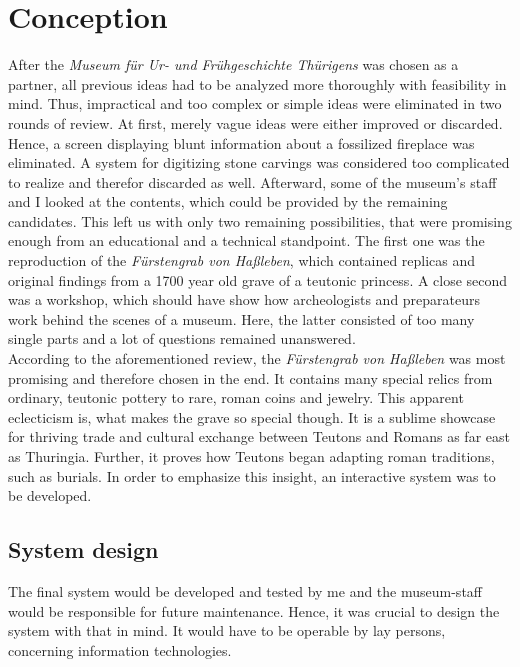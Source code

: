 \chapter{Conception}
\label{conception}

After the \textit{Museum für Ur- und Frühgeschichte Thürigens} was chosen as a partner, all previous ideas had to be analyzed more thoroughly with feasibility in mind. Thus, impractical and too complex or simple ideas were eliminated in two rounds of review. At first, merely vague ideas were either improved or discarded. Hence, a screen displaying blunt information about a fossilized fireplace was eliminated. A system for digitizing stone carvings was considered too complicated to realize and therefor discarded as well. Afterward, some of the museum's staff and I looked at the contents, which could be provided by the remaining candidates. This left us with only two remaining possibilities, that were promising enough from an educational and a technical standpoint. The first one was the reproduction of the \textit{Fürstengrab von Haßleben}, which contained replicas and original findings from a 1700 year old grave of a teutonic princess. A close second was a workshop, which should have show how archeologists and preparateurs work behind the scenes of a museum. Here, the latter consisted of too many single parts and a lot of questions remained unanswered.
\\
According to the aforementioned review, the \textit{Fürstengrab von Haßleben} was most promising and therefore chosen in the end. It contains many special relics from ordinary, teutonic pottery to rare, roman coins and jewelry. This apparent eclecticism is, what makes the grave so special though. It is a sublime showcase for thriving trade and cultural exchange between Teutons and Romans as far east as Thuringia. Further, it proves how Teutons began adapting roman traditions, such as burials. In order to emphasize this insight, an interactive system was to be developed.


\section{System design}
\label{conception_system}

The final system would be developed and tested by me and the museum-staff would be responsible for future maintenance. Hence, it was crucial to design the system with that in mind. It would have to be operable by lay persons, concerning information technologies. 

